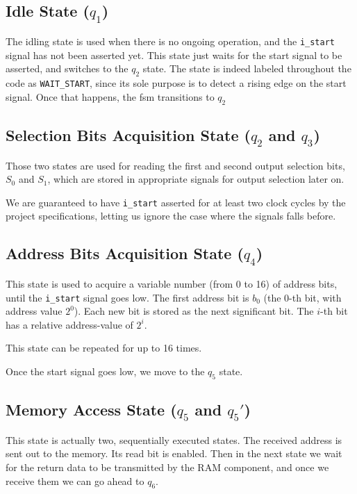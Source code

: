 \documentclass[12pt,a4paper]{article}
\newcommand{\code}{\texttt}
\begin{document}
	
	
	\subsection{Idle State ($q_1$)}
	
	The idling state is used when there is no ongoing operation, and the \code{i\_start} signal has not been asserted yet. This state just waits for the start signal to be asserted, and switches to the $q_2$ state. The state is indeed labeled throughout the code as \code{WAIT\_START}, since its sole purpose is to detect a rising edge on the start signal. Once that happens, the fsm transitions to $q_2$
	
	

	\subsection{Selection Bits Acquisition State ($q_2$ and $q_3$)}

	Those two states are used for reading the first and second output selection bits, $S_0$ and $S_1$, which are stored in appropriate signals for output selection later on.
	
	We are guaranteed to have \code{i\_start} asserted for at least two clock cycles by the project specifications, letting us ignore the case where the signals falls before.
	
	
	\subsection{Address Bits Acquisition State ($q_4$)}
	
	This state is used to acquire a variable number (from 0 to 16) of address bits, until the \code{i\_start} signal goes low. The first address bit is $b_0$ (the 0-th bit, with address value $2^0$). Each new bit is stored as the next significant bit. The $i$-th bit has a relative address-value of $2^i$.
	
	This state can be repeated for up to 16 times.

        Once the start signal goes low, we move to the $q_5$ state.
	
	\subsection{Memory Access State ($q_5$ and $q_5'$)}

        This state is actually two, sequentially executed states.
	The received address is sent out to the memory. Its read bit is enabled. 
        Then in the next state we wait for the return data to be transmitted by the RAM component, and once we receive them we can go ahead to $q_6$.
\end{document}
